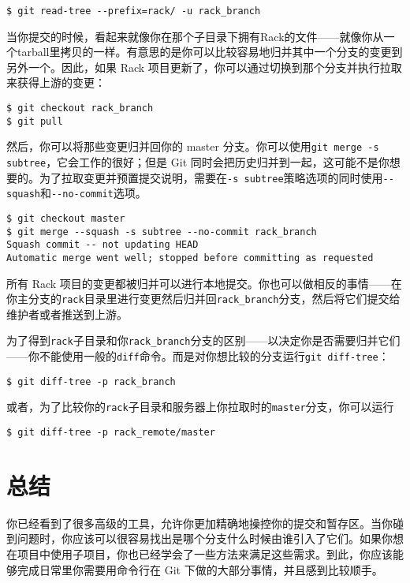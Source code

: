 \documentclass[a4paper]{book}
\begin{document}
\begin{shaded}\begin{verbatim}
$ git read-tree --prefix=rack/ -u rack_branch
\end{verbatim}\end{shaded}

当你提交的时候，看起来就像你在那个子目录下拥有Rack的文件------就像你从一个tarball里拷贝的一样。有意思的是你可以比较容易地归并其中一个分支的变更到另外一个。因此，如果 Rack 项目更新了，你可以通过切换到那个分支并执行拉取来获得上游的变更：

\begin{shaded}\begin{verbatim}
$ git checkout rack_branch
$ git pull
\end{verbatim}\end{shaded}

然后，你可以将那些变更归并回你的 master 分支。你可以使用\texttt{git merge -s subtree}，它会工作的很好；但是 Git 同时会把历史归并到一起，这可能不是你想要的。为了拉取变更并预置提交说明，需要在\texttt{-s subtree}策略选项的同时使用\texttt{-{}-squash}和\texttt{-{}-no-commit}选项。

\begin{shaded}\begin{verbatim}
$ git checkout master
$ git merge --squash -s subtree --no-commit rack_branch
Squash commit -- not updating HEAD
Automatic merge went well; stopped before committing as requested
\end{verbatim}\end{shaded}

所有 Rack 项目的变更都被归并可以进行本地提交。你也可以做相反的事情------在你主分支的\texttt{rack}目录里进行变更然后归并回\texttt{rack\_branch}分支，然后将它们提交给维护者或者推送到上游。

为了得到\texttt{rack}子目录和你\texttt{rack\_branch}分支的区别------以决定你是否需要归并它们------你不能使用一般的\texttt{diff}命令。而是对你想比较的分支运行\texttt{git diff-tree}：

\begin{shaded}\begin{verbatim}
$ git diff-tree -p rack_branch
\end{verbatim}\end{shaded}

或者，为了比较你的\texttt{rack}子目录和服务器上你拉取时的\texttt{master}分支，你可以运行

\begin{shaded}\begin{verbatim}
$ git diff-tree -p rack_remote/master
\end{verbatim}\end{shaded}

\section{总结}

你已经看到了很多高级的工具，允许你更加精确地操控你的提交和暂存区。当你碰到问题时，你应该可以很容易找出是哪个分支什么时候由谁引入了它们。如果你想在项目中使用子项目，你也已经学会了一些方法来满足这些需求。到此，你应该能够完成日常里你需要用命令行在 Git 下做的大部分事情，并且感到比较顺手。
\end{document}
